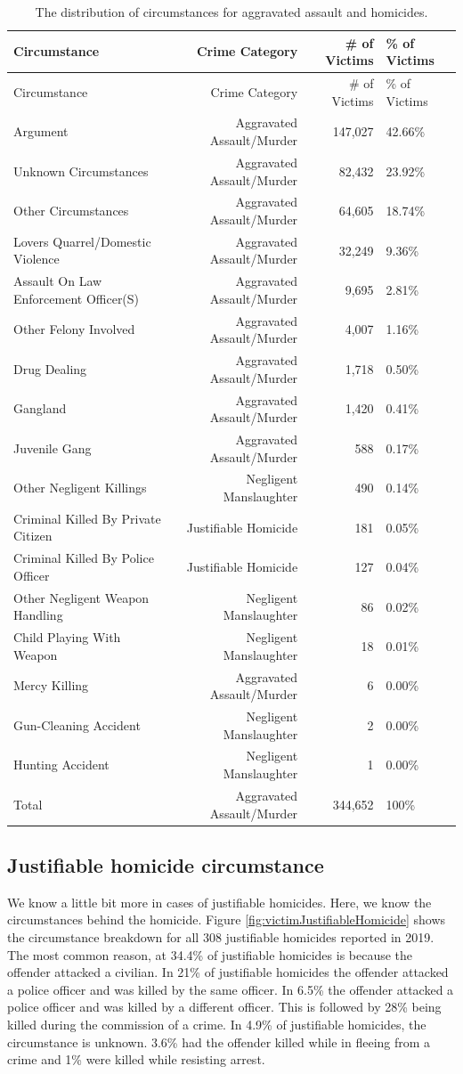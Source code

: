 \documentclass[
  12pt,
  openany]{book}
\begin{document}
\begin{longtable}[]{@{}lrrl@{}}
\caption{\label{tab:victimAggAssault}The distribution of circumstances for aggravated assault and homicides.}\tabularnewline
\toprule
Circumstance & Crime Category & \# of Victims & \% of Victims\tabularnewline
\midrule
\endfirsthead
\toprule
Circumstance & Crime Category & \# of Victims & \% of Victims\tabularnewline
\midrule
\endhead
Argument & Aggravated Assault/Murder & 147,027 & 42.66\%\tabularnewline
Unknown Circumstances & Aggravated Assault/Murder & 82,432 & 23.92\%\tabularnewline
Other Circumstances & Aggravated Assault/Murder & 64,605 & 18.74\%\tabularnewline
Lovers Quarrel/Domestic Violence & Aggravated Assault/Murder & 32,249 & 9.36\%\tabularnewline
Assault On Law Enforcement Officer(S) & Aggravated Assault/Murder & 9,695 & 2.81\%\tabularnewline
Other Felony Involved & Aggravated Assault/Murder & 4,007 & 1.16\%\tabularnewline
Drug Dealing & Aggravated Assault/Murder & 1,718 & 0.50\%\tabularnewline
Gangland & Aggravated Assault/Murder & 1,420 & 0.41\%\tabularnewline
Juvenile Gang & Aggravated Assault/Murder & 588 & 0.17\%\tabularnewline
Other Negligent Killings & Negligent Manslaughter & 490 & 0.14\%\tabularnewline
Criminal Killed By Private Citizen & Justifiable Homicide & 181 & 0.05\%\tabularnewline
Criminal Killed By Police Officer & Justifiable Homicide & 127 & 0.04\%\tabularnewline
Other Negligent Weapon Handling & Negligent Manslaughter & 86 & 0.02\%\tabularnewline
Child Playing With Weapon & Negligent Manslaughter & 18 & 0.01\%\tabularnewline
Mercy Killing & Aggravated Assault/Murder & 6 & 0.00\%\tabularnewline
Gun-Cleaning Accident & Negligent Manslaughter & 2 & 0.00\%\tabularnewline
Hunting Accident & Negligent Manslaughter & 1 & 0.00\%\tabularnewline
Total & Aggravated Assault/Murder & 344,652 & 100\%\tabularnewline
\bottomrule
\end{longtable}

\hypertarget{justifiable-homicide-circumstance}{%
\subsection{Justifiable homicide circumstance}\label{justifiable-homicide-circumstance}}

We know a little bit more in cases of justifiable homicides. Here, we know the circumstances behind the homicide. Figure \ref{fig:victimJustifiableHomicide} shows the circumstance breakdown for all 308 justifiable homicides reported in 2019. The most common reason, at 34.4\% of justifiable homicides is because the offender attacked a civilian. In 21\% of justifiable homicides the offender attacked a police officer and was killed by the same officer. In 6.5\% the offender attacked a police officer and was killed by a different officer. This is followed by 28\% being killed during the commission of a crime. In 4.9\% of justifiable homicides, the circumstance is unknown. 3.6\% had the offender killed while in fleeing from a crime and 1\% were killed while resisting arrest.
\end{document}

